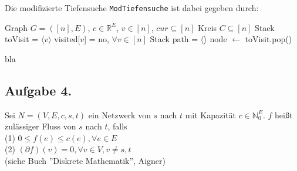 \documentclass[11pt,a4paper,ngerman]{article}
\begin{document}
Die modifizierte Tiefensuche \texttt{ModTiefensuche} ist dabei gegeben durch: \\


\begin{algorithmic}[1]
\Require Graph $G = ([n],E)$, $c \in \mathbb{R}^E$, $v \in [n]$, $cur \subseteq [n]$
\Ensure Kreis $C \subseteq [n]$
\State Stack toVisit = $\langle v \rangle$
\State visited[$v$] = no, $\forall v \in [n]$
\State Stack path = $\langle \rangle$
\State node $\gets$ toVisit.pop()

\State bla
\EndWhile
\end{algorithmic}

\subsection*{Aufgabe 4.}
Sei $N = (V,E,c,s,t)$ ein Netzwerk von $s$ nach $t$ mit Kapazität $c \in \mathbb{N}_0^E$.
$f$ heißt zulässiger Fluss von $s$ nach $t$, falls \\
(1) $0 \leq f(e) \leq c(e), \forall e \in E$ \\
(2) $(\partial f)(v) = 0, \forall v \in V, v \neq s, t$ \\
(siehe Buch ''Diskrete Mathematik'', Aigner) \\
\end{document}
